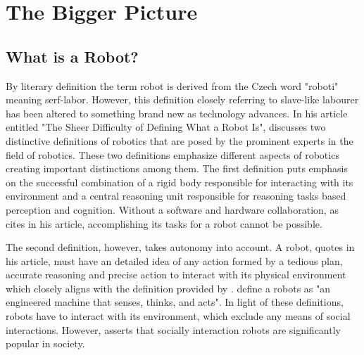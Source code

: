 \documentclass[man]{apa6}
\begin{document}
\section{The Bigger Picture}
\subsection{What is a Robot?}
\par

By literary definition the term robot is derived from the Czech word "roboti" meaning serf-labor. 
However, this definition closely referring to slave-like labourer has been altered to something brand new as technology advances.
In his article entitled "The Sheer Difficulty of Defining What a Robot Is",  discusses two distinctive definitions of robotics that are posed by the prominent experts in the field of robotics.
These two definitions emphasize different aspects of robotics creating important distinctions among them.
The first definition puts emphasis on the successful combination of a rigid body responsible for interacting with its environment and a central reasoning unit responsible for reasoning tasks based perception and cognition.
Without a software and hardware collaboration, as  cites in his article, accomplishing its tasks for a robot cannot be possible.

The second definition, however, takes autonomy into account.
A robot,  quotes in his article, must have an detailed idea of any action formed by a tedious plan, accurate reasoning and precise action to interact with its physical environment which closely aligns with the definition provided by \cite{lin}. 
\citeauthor{lin} \citeyear[p.~943]{lin} define a robots as "an engineered machine that senses, thinks, and acts".
In light of these definitions, robots have to interact with its environment, which exclude any means of social interactions.
However,  asserts that socially interaction robots are significantly popular in society.
\end{document}

